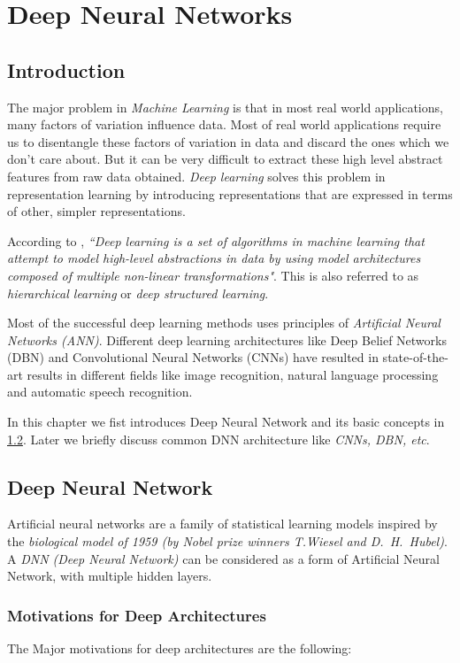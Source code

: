 \chapter{Deep Neural Networks}
\label{chap:dnn}
\section{Introduction}
The major problem in \textit{Machine Learning} is that in most real world applications, many factors of variation influence data. Most of real world applications require us to disentangle these factors of variation in data and discard the ones which we don't care about. But it can be very difficult to extract these high level abstract features from raw data obtained. \textit{Deep learning} solves this problem in representation learning by introducing representations that are expressed in terms of other, simpler representations.

According to \citet{deng2014deep}, \textit{``Deep learning is a set of algorithms in machine learning that attempt to model high-level abstractions in data by using model architectures composed of multiple non-linear transformations"}. This is also referred to as \textit{hierarchical learning} or \textit{deep structured learning}. 

Most of the successful deep learning methods uses principles of \textit{Artificial Neural Networks (ANN)}. Different deep learning architectures like Deep Belief Networks (DBN) and Convolutional Neural Networks (CNNs) have resulted in state-of-the-art results in different fields like image recognition, natural language processing and automatic speech recognition.

In this chapter we fist introduces Deep Neural Network and its basic concepts in \ref{sec:dnn:dnn}. Later we briefly discuss common DNN architecture like \textit{CNNs, DBN, etc}.

\section{Deep Neural Network}
\label{sec:dnn:dnn}
Artificial neural networks are a family of statistical learning models inspired by the \textit{biological model of 1959 (by Nobel prize winners T.Wiesel and D.~H.~Hubel)}. A \textit{DNN (Deep Neural Network)} can be considered as a form of Artificial Neural Network, with multiple hidden layers. 


\subsection{Motivations for Deep Architectures}
The Major motivations for deep architectures are the following:

